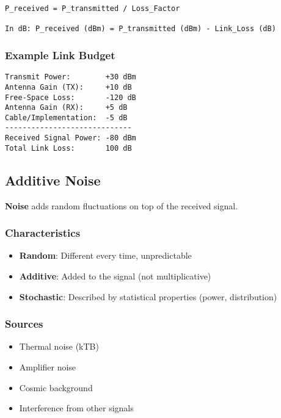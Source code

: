 \begin{verbatim}
P_received = P_transmitted / Loss_Factor

In dB: P_received (dBm) = P_transmitted (dBm) - Link_Loss (dB)
\end{verbatim}

\subsubsection{Example Link Budget}\label{example-link-budget}

\begin{verbatim}
Transmit Power:        +30 dBm
Antenna Gain (TX):     +10 dB
Free-Space Loss:       -120 dB
Antenna Gain (RX):     +5 dB
Cable/Implementation:  -5 dB
-----------------------------
Received Signal Power: -80 dBm
Total Link Loss:       100 dB
\end{verbatim}

\subsection{Additive Noise}\label{additive-noise}

\textbf{Noise} adds random fluctuations on top of the received signal.

\subsubsection{Characteristics}\label{characteristics-1}

\begin{itemize}
\tightlist
\item
  \textbf{Random}: Different every time, unpredictable
\item
  \textbf{Additive}: Added to the signal (not multiplicative)
\item
  \textbf{Stochastic}: Described by statistical properties (power,
  distribution)
\end{itemize}

\subsubsection{Sources}\label{sources-1}

\begin{itemize}
\tightlist
\item
  Thermal noise (kTB)
\item
  Amplifier noise
\item
  Cosmic background
\item
  Interference from other signals
\end{itemize}

